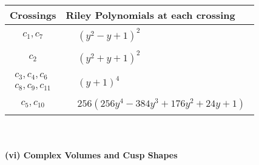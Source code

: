 \documentclass[1p]{elsarticle_modified}
\theoremstyle{definition}
\begin{document}
\begin{tabular}{m{50pt}|m{274pt}}
Crossings & \hspace{64pt}Riley Polynomials at each crossing \\
\hline $$\begin{aligned}c_{1},c_{7}\end{aligned}$$&$\begin{aligned}
&(y^2- y+1)^2
\end{aligned}$\\
\hline $$\begin{aligned}c_{2}\end{aligned}$$&$\begin{aligned}
&(y^2+y+1)^2
\end{aligned}$\\
\hline $$\begin{aligned}c_{3},c_{4},c_{6}\\c_{8},c_{9},c_{11}\end{aligned}$$&$\begin{aligned}
&(y+1)^4
\end{aligned}$\\
\hline $$\begin{aligned}c_{5},c_{10}\end{aligned}$$&$\begin{aligned}
&256(256 y^4-384 y^3+176 y^2+24 y+1)
\end{aligned}$\\
\hline
\end{tabular}\\~\\
\newpage\flushleft \textbf{(vi) Complex Volumes and Cusp Shapes}
\end{document}
